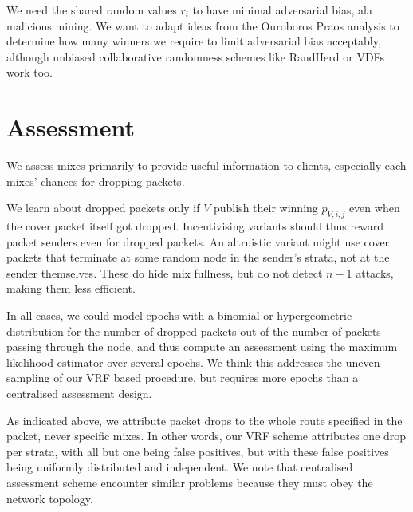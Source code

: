 ﻿\documentclass{sig-alternate-hotpets}
\newtheorem{question}{Question}
\begin{document}


We need the shared random values $r_i$ to have minimal adversarial bias, ala malicious mining.  We want to adapt ideas from the Ouroboros Praos \cite{OuroborosPraos} analysis to determine how many winners we require to limit adversarial bias acceptably, although unbiased collaborative randomness schemes like RandHerd or VDFs work too.

\section{Assessment}

We assess mixes primarily to provide useful information to clients,
especially each mixes' chances for dropping packets.

We learn about dropped packets only if $V$ publish their winning
$p_{V,i,j}$ even when the cover packet itself got dropped.  
Incentivising variants should thus reward packet senders even
for dropped packets. 
An altruistic variant might use cover packets that terminate at some
random node in the sender's strata, not at the sender themselves.
These do hide mix fullness, but do not detect $n-1$ attacks, making
them less efficient.  

In all cases, we could model epochs with a binomial or hypergeometric
distribution for the number of dropped packets out of the number of
packets passing through the node, and thus compute an assessment
using the maximum likelihood estimator over several epochs.
We think this addresses the uneven sampling of our VRF based procedure,
but requires more epochs than a centralised assessment design.

As indicated above, we attribute packet drops to the whole route
specified in the packet, never specific mixes.  In other words, our
VRF scheme attributes one drop per strata, with all but one being false
positives, but with these false positives being uniformly distributed
and independent.  We note that centralised assessment scheme encounter
similar problems because they must obey the network topology.
\end{document}
